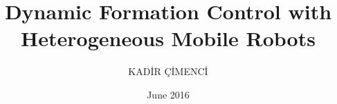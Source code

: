 \documentclass[chaparabic,ee,ms,12pt,oneandhalf]{metu}
\author{KADİR ÇİMENCİ}
\title{Dynamic Formation Control with Heterogeneous Mobile Robots}
\date{June 2016}
\begin{document}
\begin{preliminaries}

%
\end{preliminaries}
%   
% 
%







  





%


 
%

\end{document}
